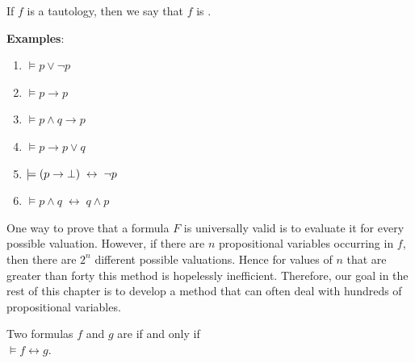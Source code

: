 \noindent
If $f$ is a tautology, then we say that $f$ is  .

\noindent
\textbf{Examples}:
\begin{enumerate}
\item $\models p \vee \neg p$
\item $\models p \rightarrow p$
\item $\models p \wedge q \rightarrow p$
\item $\models p \rightarrow p \vee q$
\item $\models (p \rightarrow \bot) \;\leftrightarrow\; \neg p$
\item $\models p \wedge q \;\leftrightarrow\; q \wedge p$
\end{enumerate}
One way to prove that a formula $F$ is universally valid is to evaluate it for every possible valuation.
However, if there are $n$ propositional variables occurring in $f$, then there are $2^n$ different possible
valuations. 
Hence for values of $n$ that are greater than forty this method is hopelessly inefficient.  Therefore, our
goal in the rest of this chapter is to develop 
a method that can often deal with hundreds of propositional variables.

\begin{Definition}[Equivalent]
  Two formulas $f$ and $g$ are   if and only if  \\[0.2cm]
  \hspace*{1.3cm} $\models f \leftrightarrow g$.   
  \eox
\end{Definition}

